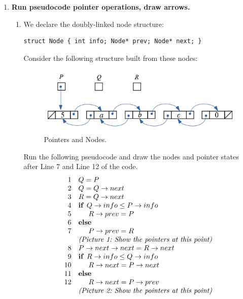 \documentclass[a4paper,12pt]{article}
\begin{document}
\begin{enumerate}[label=1.\Alph*.]
\item {\bf Run pseudocode pointer operations, draw arrows.}
\begin{enumerate}
\item We declare the doubly-linked node structure:
\begin{verbatim}
struct Node { int info; Node* prev; Node* next; }
\end{verbatim}
Consider the following structure built from these nodes:
\begin{figure}[!htb]
\includegraphics[width=4in]{exam1-review-topics/pointers-and-nodes.png}
\caption{\label{fig:pointers-and-nodes} Pointers and Nodes.}
\end{figure}
Run the following pseudocode and 
draw the nodes and pointer states after Line 7 and Line 12 of the code.
\[ \begin{array}{rl}
1 & Q = P\\
2 & Q = Q\rightarrow next\\
3 & R = Q\rightarrow next\\
4 & \text{\textbf{if\ }} Q\rightarrow info \leq P\rightarrow info\\
5 & \hspace{.5cm} R\rightarrow prev = P\\
6 & \text{\textbf{else\ }}\\
7 & \hspace{.5cm} P\rightarrow  prev = R\\
  & \text{\em (Picture\ 1:\ Show\ the\ pointers\ at\ this\ point) }\\
8 & P\rightarrow next\rightarrow next = R\rightarrow next\\
9 & \text{\textbf{if\ }} R\rightarrow info \leq Q\rightarrow info\\
10 & \hspace{.5cm} R\rightarrow next = P\rightarrow next\\
11 & \text{\textbf{else\ }}\\
12 & \hspace{.5cm} R\rightarrow next = P\rightarrow prev\\
  & \text{\em (Picture\ 2:\ Show\ the\ pointers\ at\ this\ point) }\\
\end{array} \]
\end{enumerate}


\end{enumerate}
\end{document}
